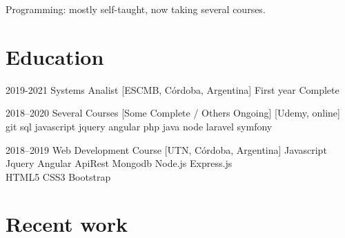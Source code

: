 Programming: mostly self-taught, now taking several courses.



\section{Education}

\begin{twenty} %
        \twentyitem%
        {2019-2021}
        {Systems Analist}
        {[ESCMB, Córdoba, Argentina]}
        {First year Complete}
        
        \twentyitem%
        {2018--2020}
        {Several Courses [Some Complete / Others Ongoing]}
        {[Udemy, online]}
        {git sql javascript jquery angular php java node laravel symfony}
 	
 	\twentyitem%
 	{2018--2019}
 	{Web Development Course}
 	{[UTN, Córdoba, Argentina]}
 	{Javascript Jquery Angular ApiRest Mongodb Node.js Express.js\\
 	HTML5 CSS3 Bootstrap}
\end{twenty}

\section{Recent work}

